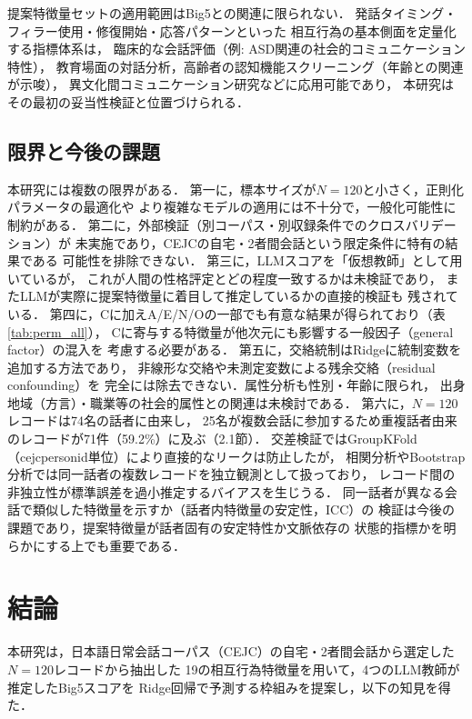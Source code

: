 \documentclass[dvipdfmx,11pt,a4paper]{bxjsarticle}
\renewcommand{\_}{\paperorigunderscore\allowbreak}%
\begin{document}
提案特徴量セットの適用範囲はBig5との関連に限られない．
発話タイミング・フィラー使用・修復開始・応答パターンといった
相互行為の基本側面を定量化する指標体系は，
臨床的な会話評価（例: ASD関連の社会的コミュニケーション特性），
教育場面の対話分析，高齢者の認知機能スクリーニング（年齢との関連が示唆），
異文化間コミュニケーション研究などに応用可能であり，
本研究はその最初の妥当性検証と位置づけられる．

\subsection{限界と今後の課題}

本研究には複数の限界がある．
第一に，標本サイズが$N = 120$と小さく，正則化パラメータの最適化や
より複雑なモデルの適用には不十分で，一般化可能性に制約がある．
第二に，外部検証（別コーパス・別収録条件でのクロスバリデーション）が
未実施であり，CEJCの自宅・2者間会話という限定条件に特有の結果である
可能性を排除できない．
第三に，LLMスコアを「仮想教師」として用いているが，
これが人間の性格評定とどの程度一致するかは未検証であり，
またLLMが実際に提案特徴量に着目して推定しているかの直接的検証も
残されている．
第四に，Cに加えA/E/N/Oの一部でも有意な結果が得られており（表\ref{tab:perm_all}），
Cに寄与する特徴量が他次元にも影響する一般因子（general factor）の混入を
考慮する必要がある．
第五に，交絡統制はRidgeに統制変数を追加する方法であり，
非線形な交絡や未測定変数による残余交絡（residual confounding）を
完全には除去できない．属性分析も性別・年齢に限られ，
出身地域（方言）・職業等の社会的属性との関連は未検討である．
第六に，$N = 120$レコードは74名の話者に由来し，
25名が複数会話に参加するため重複話者由来のレコードが71件（59.2\%）に及ぶ（2.1節）．
交差検証ではGroupKFold（cejc\_person\_id単位）により直接的なリークは防止したが，
相関分析やBootstrap分析では同一話者の複数レコードを独立観測として扱っており，
レコード間の非独立性が標準誤差を過小推定するバイアスを生じうる．
同一話者が異なる会話で類似した特徴量を示すか（話者内特徴量の安定性，ICC）の
検証は今後の課題であり，提案特徴量が話者固有の安定特性か文脈依存の
状態的指標かを明らかにする上でも重要である．

\section{結論}

本研究は，日本語日常会話コーパス（CEJC）の自宅・2者間会話から選定した$N = 120$レコードから抽出した
19の相互行為特徴量を用いて，4つのLLM教師が推定したBig5スコアを
Ridge回帰で予測する枠組みを提案し，以下の知見を得た．
\end{document}
